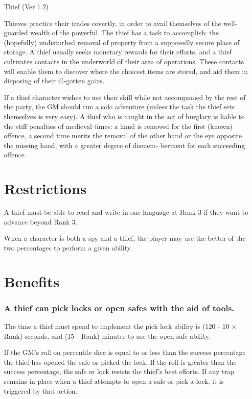 \begin{Chapter}{Thief (Ver 1.2)}

Thieves practice their trades covertly, in order to avail themselves
of the well-guarded wealth of the powerful.  The thief has a task to
accomplish: the (hopefully) undisturbed removal of property from a
supposedly secure place of storage.  A thief usually seeks monetary
rewards for their efforts, and a thief cultivates contacts in the
underworld of their area of operations. These contacts will enable
them to discover where the choicest items are stored, and aid them in
disposing of their ill-gotten gains.

If a thief character wishes to use their skill while not accompanied
by the rest of the party, the GM should run a solo adventure (unless
the task the thief sets themselves is very easy).  A thief who is
caught in the act of burglary is liable to the stiff penalties of
medieval times: a hand is removed for the first (known) offence, a
second time merits the removal of the other hand or the eye opposite
the missing hand, with a greater degree of dismem- berment for each
succeeding offence.

\section{Restrictions}

A thief must be able to read and write in one language at Rank 3 if
they want to advance beyond Rank 3.

When a character is both a spy and a thief, the player may use the
better of the two percentages to perform a given ability.

\section{Benefits}

\subsubsection{A thief can pick locks or open safes with the aid of tools.}

The time a thief must spend to implement the pick lock ability is (120
- 10 × Rank) seconds, and (15 - Rank) minutes to use the open safe
ability.

If the GM’s roll on percentile dice is equal to or less than the
success percentage the thief has opened the safe or picked the lock.
If the roll is greater than the success percentage, the safe or lock
resists the thief’s best efforts.  If any trap remains in place when a
thief attempts to open a safe or pick a lock, it is triggered by that
action.


\end{Chapter}
